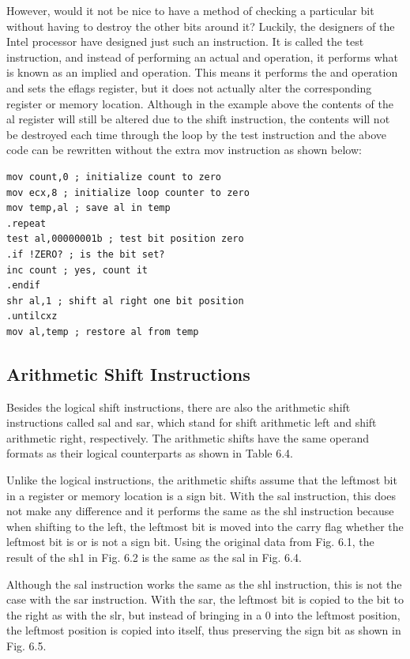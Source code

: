 \documentclass[10pt]{article}
\begin{document}
However, would it not be nice to have a method of checking a particular bit without having to destroy the other bits around it? Luckily, the designers of the Intel processor have designed just such an instruction. It is called the test instruction, and instead of performing an actual and operation, it performs what is known as an implied and operation. This means it performs the and operation and sets the eflags register, but it does not actually alter the corresponding register or memory location. Although in the example above the contents of the al register will still be altered due to the shift instruction, the contents will not be destroyed each time through the loop by the test instruction and the above code can be rewritten without the extra mov instruction as shown below:

\begin{verbatim}
mov count,0 ; initialize count to zero
mov ecx,8 ; initialize loop counter to zero
mov temp,al ; save al in temp
.repeat
test al,00000001b ; test bit position zero
.if !ZERO? ; is the bit set?
inc count ; yes, count it
.endif
shr al,1 ; shift al right one bit position
.untilcxz
mov al,temp ; restore al from temp
\end{verbatim}

\subsection*{Arithmetic Shift Instructions}
Besides the logical shift instructions, there are also the arithmetic shift instructions called sal and sar, which stand for shift arithmetic left and shift arithmetic right, respectively. The arithmetic shifts have the same operand formats as their logical counterparts as shown in Table 6.4.

Unlike the logical instructions, the arithmetic shifts assume that the leftmost bit in a register or memory location is a sign bit. With the sal instruction, this does not make any difference and it performs the same as the shl instruction because when shifting to the left, the leftmost bit is moved into the carry flag whether the leftmost bit is or is not a sign bit. Using the original data from Fig. 6.1, the result of the sh1 in Fig. 6.2 is the same as the sal in Fig. 6.4.

Although the sal instruction works the same as the shl instruction, this is not the case with the sar instruction. With the sar, the leftmost bit is copied to the bit to the right as with the slr, but instead of bringing in a 0 into the leftmost position, the leftmost position is copied into itself, thus preserving the sign bit as shown in Fig. 6.5.
\end{document}
